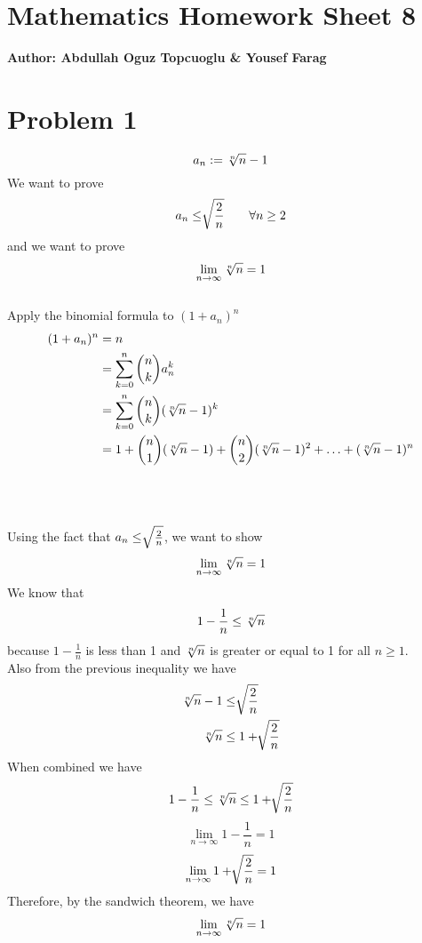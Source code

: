 \documentclass{article}
\begin{document}
\section*{\huge Mathematics Homework Sheet 8}
\begin{flushright}
   \textbf{Author: Abdullah Oguz Topcuoglu \& Yousef Farag}
\end{flushright}

\section*{Problem 1}
\[
   a_n := \root n \of {n} - 1
\]
We want to prove
\[
   a_n \leq \root \of {\frac{2}{n}} \qquad \forall n \geq 2
\]
and we want to prove
\[
   \lim_{n \rightarrow \infty} \root n \of {n} = 1
\]
\\
Apply the binomial formula to \((1 + a_n)^n\)
\begin{align*}
   (1 + a_n)^n &= n \\
               &= \sum_{k=0}^{n} \binom{n}{k} a_n^k \\
               &= \sum_{k=0}^{n} \binom{n}{k} (\root n \of {n} - 1)^k \\
               &= 1 + \binom{n}{1}(\root n \of {n} - 1) + \binom{n}{2} (\root n \of {n} - 1)^2 + \ldots + (\root n \of {n} - 1)^n \\
\end{align*}
\\
\\
\\
Using the fact that \(a_n \leq \root \of {\frac{2}{n}}\), we want to show
\[
   \lim_{n \rightarrow \infty} \root n \of {n} = 1
\]
We know that
\[
   1 - \frac{1}{n} \leq \root n \of {n}
\]
because \(1 - \frac{1}{n}\) is less than 1 and \(\root n \of {n}\) is greater or equal to 1 for all \(n \geq 1\). \\
Also from the previous inequality we have
\begin{align*}
   \root n \of {n} - 1 &\leq \root \of {\frac{2}{n}} \\
   \root n \of {n} &\leq 1 + \root \of {\frac{2}{n}}
\end{align*}
When combined we have
\[
   1 - \frac{1}{n} \leq \root n \of {n} \leq 1 + \root \of {\frac{2}{n}}
\]
\[
   \lim_{n \rightarrow \infty} 1 - \frac{1}{n} = 1
\]
\[
   \lim_{n \rightarrow \infty} 1 + \root \of {\frac{2}{n}} = 1
\]
Therefore, by the sandwich theorem, we have
\[
   \lim_{n \rightarrow \infty} \root n \of {n} = 1
\]
\end{document}

